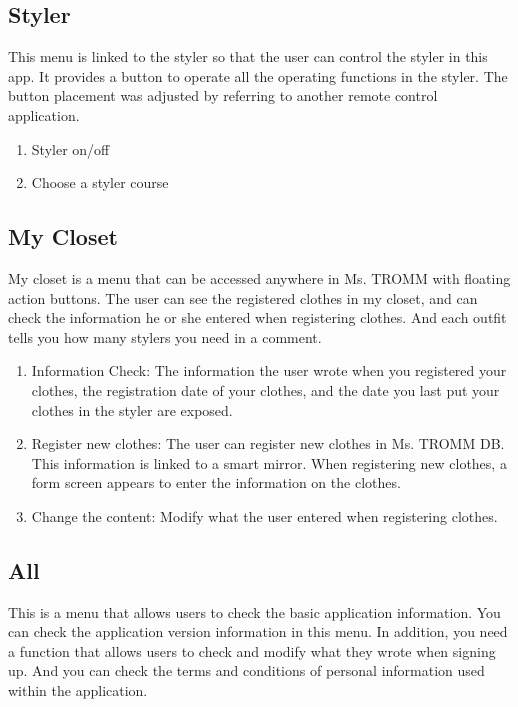 \documentclass[conference]{IEEEtran}
\begin{document}
\subsection{Styler}
This menu is linked to the styler so that the user can control the styler in this app. It provides a button to operate all the operating functions in the styler. The button placement was adjusted by referring to another remote control application.\\
\begin{enumerate}
    \item Styler on/off\\
    \item Choose a styler course\\
\end{enumerate}

\subsection{My Closet}
My closet is a menu that can be accessed anywhere in Ms. TROMM with floating action buttons. The user can see the registered clothes in my closet, and can check the information he or she entered when registering clothes. And each outfit tells you how many stylers you need in a comment.\\
\begin{enumerate}
    \item Information Check: The information the user wrote when you registered your clothes, the registration date of your clothes, and the date you last put your clothes in the styler are exposed.\\
    \item Register new clothes: The user can register new clothes in Ms. TROMM DB. This information is linked to a smart mirror. When registering new clothes, a form screen appears to enter the information on the clothes.\\
    \item Change the content: Modify what the user entered when registering clothes. 
\end{enumerate}

\subsection{All}
This is a menu that allows users to check the basic application information. You can check the application version information in this menu. In addition, you need a function that allows users to check and modify what they wrote when signing up. And you can check the terms and conditions of personal information used within the application.\\
\end{document}
